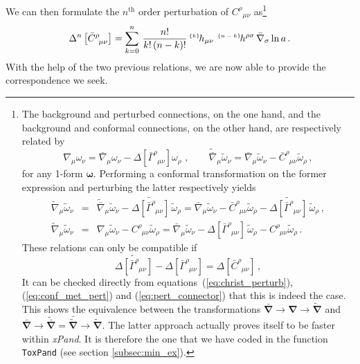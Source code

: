 \documentclass[notitlepage,onecolumn,floatfix,preprintnumbers,aps,prd,showpacs,nofootinbib,amsmath,amssymb,amsfonts]{revtex4-1}
\newcommand{\be}{\begin{equation}}
\newcommand{\ee}{\end{equation}}
\newcommand{\bea}{\begin{eqnarray}}
\newcommand{\eea}{\end{eqnarray}}
\newcommand{\<}{\langle}
\renewcommand{\>}{\rangle}
\newcommand{\pert}[2]{{}^{\mbox{\,\tiny $\{#1\}\!$}}{#2}}
\begin{document}
We can then formulate the $n^{\mathrm{th}}$ order perturbation of ${C^\rho}_{\mu\nu}$ as\footnote{%
%
%
The background and perturbed connections, on the one hand, and the background and conformal connections, on the other hand, 
are respectively related by 
\be
	{\nabla}_\mu {\omega}_\nu 
		= \bar{\nabla}_\mu {\omega_\nu} - \Delta[\bar\Gamma^{\rho}_{\phantom{\rho} \mu \nu}]{ \omega}_\rho \,\, , \qquad 
	\widetilde{\bar \nabla}_\mu \widetilde{\omega}_\nu 
		= \bar{\nabla}_\mu {\widetilde{\omega}_\nu} - \bar C^{\rho}_{\phantom{\rho} \mu \nu} \widetilde{\omega}_\rho \, , \nonumber 
\ee
for any 1-form $\bm \omega$. Performing a conformal transformation on the former expression and perturbing the latter respectively yields 
\bea
	\widetilde{\nabla}_\mu \widetilde{\omega}_\nu 
		& = & \widetilde{\bar{\nabla}}_\mu \widetilde{\omega}_\nu 
			- \widetilde{\Delta[\bar\Gamma^{\rho}_{\phantom{\rho} \mu \nu}]} \, \widetilde{\omega}_\rho 
		= \bar{\nabla}_\mu \widetilde{\omega}_\nu - \bar C^{\rho}_{\phantom{\rho} \mu \nu} \widetilde{\omega}_\rho 
			- \widetilde{\Delta[\bar\Gamma^{\rho}_{\phantom{\rho} \mu \nu}]} \, \widetilde{\omega}_\rho \, , \nonumber \\
	\widetilde{\nabla}_\mu \widetilde{\omega}_\nu 
		& = & {\nabla}_\mu \widetilde{\omega}_\nu - C^{\rho}_{\phantom{\rho} \mu \nu} \widetilde{\omega}_\rho 
		= \bar{\nabla}_\mu \widetilde{\omega}_\nu - \Delta[\bar\Gamma^{\rho}_{\phantom{\rho} \mu \nu}] \, \widetilde{ \omega}_\rho 
			- C^{\rho}_{\phantom{\rho} \mu \nu} \widetilde{\omega}_\rho \, . \nonumber 
\eea
These relations can only be compatible if
\be
	\widetilde{\Delta[\bar{\Gamma}^\rho_{\phantom{\rho} \mu\nu}]} -\Delta[\bar {\Gamma}^\rho_{\phantom{\rho} \mu\nu}] 
		= \Delta[\bar C^\rho_{\phantom{\rho} \mu\nu}] \, , \nonumber 
\ee
It can be checked directly from
equations~(\ref{eq:christ_perturb}), (\ref{eq:conf_met_pert}) and (\ref{eq:pert_connector}) that this
is indeed the case.
This shows the equivalence between the transformations $\bar{\bm \nabla} \to {\bm \nabla} \to \widetilde{\bm \nabla}$ and 
$\bar{\bm \nabla} \to \widetilde{\bar{\bm \nabla}} = \bar{\widetilde{\bm \nabla}} \to \widetilde{\bm \nabla}$. 
The latter approach actually proves itself to be faster within \textit{xPand}. 
It is therefore the one that we have coded in the function {\tt ToxPand} (see section \ref{subsec:min_ex}). 
%
%
}
%
\be
	\Delta^{n} \left[ \bar C^\rho_{\phantom{\rho}\mu\nu} \right] 
		= \sum_{k=0}^n \, \frac{n!}{k! \, (n-k)!} \pert{k}{h_{\mu\nu}} \, 
		\pert{n-k}{h^{\rho \sigma}} \, \bar \nabla_\sigma \ln a \, . 
	\label{eq:pert_connector}
\ee
With the help of the two previous relations, we are now able 
to provide the correspondence we seek. 
\end{document}

